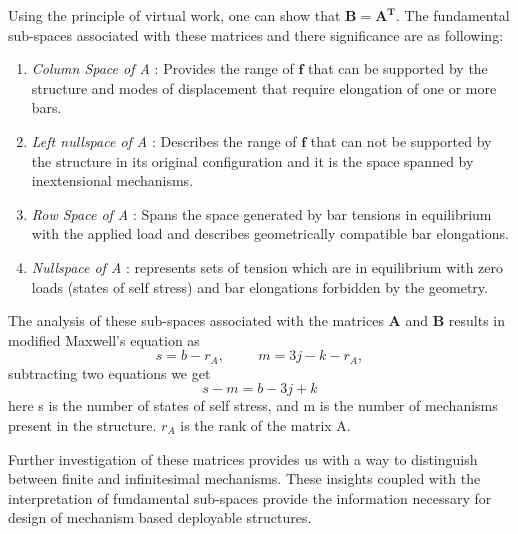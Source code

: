 \noindent Using the principle of virtual work, one can show that $\boldsymbol{B = A^T}$. The fundamental sub-spaces associated with these matrices and there significance are as following:

\begin{enumerate}
    \item \textit{Column Space of A} : Provides the range of $\boldsymbol{f}$ that can be supported by the structure and modes of displacement that require elongation of one or more bars.

    \item\textit{Left nullspace of A} : Describes the range of $\boldsymbol{f}$ that can not be supported by the structure in its original configuration and it is the space spanned by inextensional mechanisms.

    \item\textit{Row Space of A} : Spans the space generated by bar tensions in equilibrium with the applied load and describes geometrically compatible bar elongations.

    \item\textit{Nullspace of A} : represents sets of tension which are in equilibrium with zero loads (states of self stress) and bar elongations forbidden by the geometry.
\end{enumerate}



The analysis of these sub-spaces associated with the matrices $\boldsymbol{A}$ and $\boldsymbol{B}$ results in modified Maxwell's equation as
\begin{equation}
    s = b - r_{A},  \hspace{1cm} m = 3j - k - r_{A},
    \label{eq:cacona}
\end{equation}
\noindent subtracting two equations we get
\begin{equation}
    s - m = b - 3j + k
    \label{eq:cacona}
\end{equation}
\noindent here s is the number of states of self stress, and m is the number of mechanisms present in the structure. $r_{A}$ is the rank of the matrix A.

Further investigation of these matrices provides us with a way to distinguish between finite and infinitesimal mechanisms. These insights coupled with the interpretation of fundamental sub-spaces provide the information necessary for design of mechanism based deployable structures\cite{Pelle}. 


